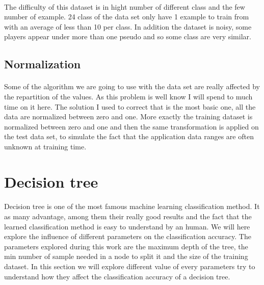 \documentclass[twocolumn,a4paper,10pt]{article}
\begin{document}
\paragraph{}
The difficulty of this dataset is in hight number of different class and the few number of example. 24 class of the data set only have 1 example to train from with an average of less than 10 per class. In addition the dataset is noisy, some players appear under more than one pseudo and so some class are very similar.

\subsection{Normalization}
\paragraph{}
Some of the algorithm we are going to use with the data set are really affected by the repartition of the values. As this problem is well know I will spend to much time on it here. The solution I used to correct that is the most basic one, all the data are normalized between zero and one. More exactly the training dataset is normalized between zero and one and then the same transformation is applied on the test data set, to simulate the fact that the application data ranges are often unknown at training time.




\section{Decision tree}
\paragraph{}
Decision tree is one of the most famous machine learning classification method. It as many advantage, among them their really good results and the fact that the learned classification method is easy to understand by an human. We will here explore the influence of different parameters on the classification accuracy. The parameters explored during this work are the maximum depth of the tree, the min number of sample needed in a node to split it and the size of the training dataset. In this section we will explore different value of every parameters try to understand how they affect the classification accuracy of a decision tree.
\end{document}
